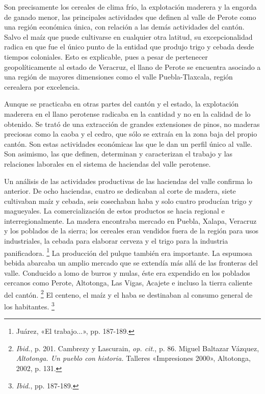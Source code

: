 \documentclass[14pt,twoside,final]{extbook} %
\let\oldfootnote\footnote
\renewcommand\footnote[1]{%
\oldfootnote{\hspace{1mm}#1}}
\begin{document}
Son precisamente los cereales de clima frío, la explotación maderera y la engorda de ganado menor, las principales actividades que definen al valle de Perote como una región económica única, con relación a las demás actividades del cantón. Salvo el maíz que puede cultivarse en cualquier otra latitud, su excepcionalidad radica en que fue el único punto de la entidad que produjo trigo y cebada desde tiempos coloniales. Esto es explicable, pues a pesar de pertenecer geopolíticamente al estado de Veracruz, el llano de Perote se encuentra asociado a una región de mayores dimensiones como el valle Puebla-Tlaxcala, región cerealera por excelencia.

Aunque se practicaba en otras partes del cantón y el estado, la explotación maderera en el llano perotense radicaba en la cantidad y no en la calidad de lo obtenido. Se trató de una extracción de grandes extensiones de pinos, no maderas preciosas como la caoba y el cedro, que sólo se extraía en la zona baja del propio cantón. Son estas actividades económicas las que le dan un perfil único al valle. Son asimismo, las que definen, determinan y caracterizan el trabajo y las relaciones laborales en el sistema de haciendas del valle perotense.

Un análisis de las actividades productivas de las haciendas del valle confirma lo anterior. De ocho haciendas, cuatro se dedicaban al corte de madera, siete cultivaban maíz y cebada, seis cosechaban haba y solo cuatro producían trigo y magueyales. La comercialización de estos productos se hacia regional e interregionalmente. La madera encontraba mercado en Puebla, Xalapa, Veracruz y los poblados de la sierra; los cereales eran vendidos fuera de la región para usos industriales, la cebada para elaborar cerveza y el trigo para la industria panificadora.\footnote{Juárez, «El trabajo...», pp. 187-189.} La producción del pulque también era importante. La espumosa bebida abarcaba un amplio mercado que se extendía más allá de las fronteras del valle. Conducido a lomo de burros y mulas, éste era expendido en los poblados cercanos como Perote, Altotonga, Las Vigas, Acajete e incluso la tierra caliente del cantón.\footnote{\emph{Ibid.}, p. 201. Cambrezy y Lascurain, \emph{op. cit.}, p. 86. Miguel Baltazar Vázquez, \emph{Altotonga. Un pueblo con historia.} Talleres «Impresiones 2000», Altotonga, 2002, p. 131.} El centeno, el maíz y el haba se destinaban al consumo general de los habitantes.\footnote{\emph{Ibid.}, pp. 187-189.}
\end{document}
